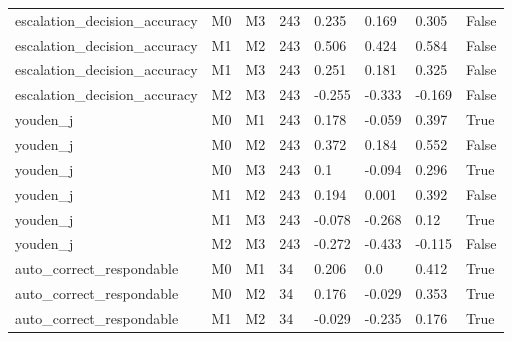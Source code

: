 \begin{table}[!t]
{\begin{tabular}{llllllll}
escalation\_decision\_accuracy & M0 & M3 & 243 & 0.235 & 0.169 & 0.305 & False \\
escalation\_decision\_accuracy & M1 & M2 & 243 & 0.506 & 0.424 & 0.584 & False \\
escalation\_decision\_accuracy & M1 & M3 & 243 & 0.251 & 0.181 & 0.325 & False \\
escalation\_decision\_accuracy & M2 & M3 & 243 & -0.255 & -0.333 & -0.169 & False \\
youden\_j & M0 & M1 & 243 & 0.178 & -0.059 & 0.397 & True \\
youden\_j & M0 & M2 & 243 & 0.372 & 0.184 & 0.552 & False \\
youden\_j & M0 & M3 & 243 & 0.1 & -0.094 & 0.296 & True \\
youden\_j & M1 & M2 & 243 & 0.194 & 0.001 & 0.392 & False \\
youden\_j & M1 & M3 & 243 & -0.078 & -0.268 & 0.12 & True \\
youden\_j & M2 & M3 & 243 & -0.272 & -0.433 & -0.115 & False \\
auto\_correct\_respondable & M0 & M1 & 34 & 0.206 & 0.0 & 0.412 & True \\
auto\_correct\_respondable & M0 & M2 & 34 & 0.176 & -0.029 & 0.353 & True \\
auto\_correct\_respondable & M1 & M2 & 34 & -0.029 & -0.235 & 0.176 & True \\
\bottomrule
\end{tabular}}
\end{table}
